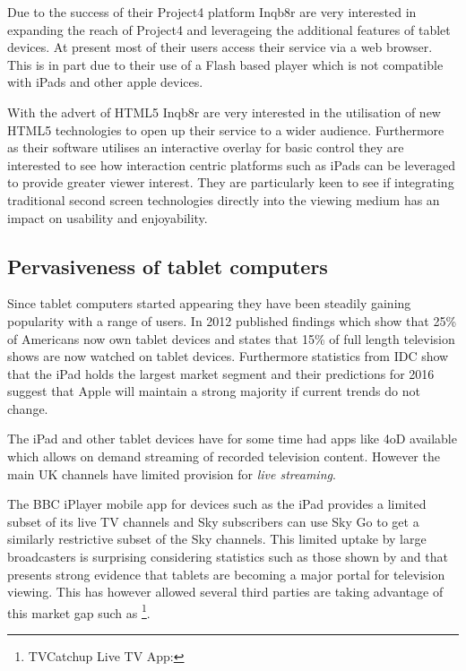 	Due to the success of their Project4 platform Inqb8r are very interested in expanding the reach of Project4 and leverageing the additional features of tablet devices. At present most of their users access their service via a web browser. This is in part due to their use of a Flash based player which is not compatible with iPads and other apple devices.
	
	With the advert of HTML5 Inqb8r are very interested in the utilisation of new HTML5 technologies to open up their service to a wider audience. Furthermore as their software utilises an interactive overlay for basic control they are interested to see how interaction centric platforms such as iPads can be leveraged to provide greater viewer interest. They are particularly keen to see if integrating traditional second screen technologies directly into the viewing medium has an impact on usability and enjoyability. 

\subsection{Pervasiveness of tablet computers}
Since tablet computers started appearing they have been steadily gaining popularity with a range of users. In 2012 \citet{pewResearch} published findings which show that 25\% of Americans now own tablet devices and \citet{viacom} states that 15\% of full length television shows are now watched on tablet devices. Furthermore statistics from IDC show that the iPad holds the largest market segment and their predictions for 2016 suggest that Apple will maintain a strong majority if current trends do not change.

The iPad and other tablet devices have for some time had apps like 4oD available which allows on demand streaming of recorded television content. However the main UK channels have limited provision for \textit{live streaming}.%

The BBC iPlayer mobile app for devices such as the iPad provides a limited subset of its live TV channels and Sky subscribers can use Sky Go to get a similarly restrictive subset of the Sky channels. This limited uptake by large broadcasters is surprising considering statistics such as those shown by \citet{viacom} and that \citep{socialTVPaper} presents strong evidence that tablets are becoming a major portal for television viewing. This has however allowed several third parties are taking advantage of this market gap such as \footnote{TVCatchup Live TV App: }.

